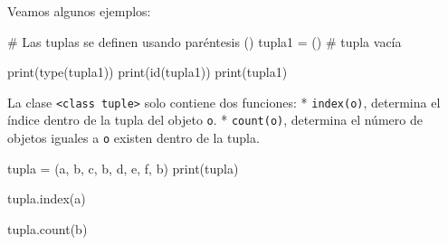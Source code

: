 \documentclass[
  letterpaper,
  DIV=11,
  numbers=noendperiod]{scrreprt}
\newenvironment{Shaded}{\begin{snugshade}}{\end{snugshade}}
\newcommand{\BuiltInTok}[1]{\textcolor[rgb]{0.00,0.23,0.31}{#1}}
\newcommand{\CommentTok}[1]{\textcolor[rgb]{0.37,0.37,0.37}{#1}}
\newcommand{\NormalTok}[1]{\textcolor[rgb]{0.00,0.23,0.31}{#1}}
\newcommand{\OperatorTok}[1]{\textcolor[rgb]{0.37,0.37,0.37}{#1}}
\newcommand{\StringTok}[1]{\textcolor[rgb]{0.13,0.47,0.30}{#1}}
\begin{document}
Veamos algunos ejemplos:

\begin{Shaded}
\begin{Highlighting}[]
\CommentTok{\# Las tuplas se definen usando paréntesis ()}
\NormalTok{tupla1 }\OperatorTok{=}\NormalTok{ () }\CommentTok{\# tupla vacía}

\BuiltInTok{print}\NormalTok{(}\BuiltInTok{type}\NormalTok{(tupla1))}
\BuiltInTok{print}\NormalTok{(}\BuiltInTok{id}\NormalTok{(tupla1))}
\BuiltInTok{print}\NormalTok{(tupla1)}
\end{Highlighting}
\end{Shaded}

La clase
\texttt{\textless{}class\ \textquotesingle{}tuple\textquotesingle{}\textgreater{}}
solo contiene dos funciones: * \texttt{index(o)}, determina el índice
dentro de la tupla del objeto \texttt{o}. * \texttt{count(o)}, determina
el número de objetos iguales a \texttt{o} existen dentro de la tupla.

\begin{Shaded}
\begin{Highlighting}[]
\NormalTok{tupla }\OperatorTok{=}\NormalTok{ (}\StringTok{\textquotesingle{}a\textquotesingle{}}\NormalTok{, }\StringTok{\textquotesingle{}b\textquotesingle{}}\NormalTok{, }\StringTok{\textquotesingle{}c\textquotesingle{}}\NormalTok{, }\StringTok{\textquotesingle{}b\textquotesingle{}}\NormalTok{, }\StringTok{\textquotesingle{}d\textquotesingle{}}\NormalTok{, }\StringTok{\textquotesingle{}e\textquotesingle{}}\NormalTok{, }\StringTok{\textquotesingle{}f\textquotesingle{}}\NormalTok{, }\StringTok{\textquotesingle{}b\textquotesingle{}}\NormalTok{)}
\BuiltInTok{print}\NormalTok{(tupla)}
\end{Highlighting}
\end{Shaded}

\begin{Shaded}
\begin{Highlighting}[]
\NormalTok{tupla.index(}\StringTok{\textquotesingle{}a\textquotesingle{}}\NormalTok{)}
\end{Highlighting}
\end{Shaded}

\begin{Shaded}
\begin{Highlighting}[]
\NormalTok{tupla.count(}\StringTok{\textquotesingle{}b\textquotesingle{}}\NormalTok{)}
\end{Highlighting}
\end{Shaded}
\end{document}
